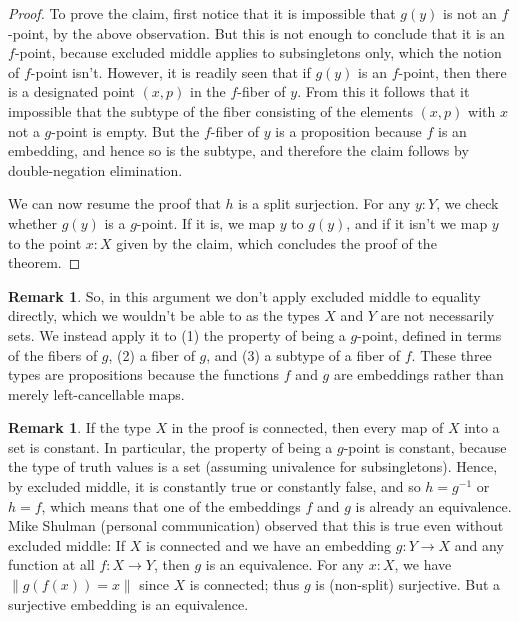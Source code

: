 \documentclass{article}
\theoremstyle{definition}
\newtheorem{remark}[theorem]{Remark}
\begin{document}
\begin{proof}
To prove the claim, first notice that it is impossible that $g(y)$ is not an $f$-point, by the above observation. But this is not enough to conclude that it is an $f$-point, because excluded middle applies to subsingletons only, which the notion of $f$-point isn't. However, it is readily seen that if $g(y)$ is an $f$-point, then there is a designated point $(x,p)$ in the $f$-fiber of $y$. From this it follows that it impossible that the subtype of the fiber consisting of the elements $(x,p)$ with $x$ not a $g$-point is empty. But the $f$-fiber of $y$ is a proposition because $f$ is an embedding, and hence so is the subtype, and therefore the claim follows by double-negation elimination.

We can now resume the proof that $h$ is a split surjection. For any $y:Y$, we check whether $g(y)$ is a $g$-point. If it is, we map $y$ to $g(y)$, and if it isn't we map $y$ to the point $x : X$ given by the claim, which concludes the proof of the theorem.
\end{proof}

\begin{remark}
So, in this argument we don't apply excluded middle to equality
directly, which we wouldn't be able to as the types $X$ and $Y$ are
not necessarily sets. We instead apply it to (1) the property of being
a $g$-point, defined in terms of the fibers of $g$, (2) a fiber of
$g$, and (3) a subtype of a fiber of $f$. These three types are
propositions because the functions $f$ and $g$ are embeddings rather
than merely left-cancellable maps.
\end{remark}

\begin{remark}
  If the type $X$ in the proof is connected, then every map of $X$
  into a set is constant. In particular, the property of being a
  $g$-point is constant, because the type of truth values is a set
  (assuming univalence for subsingletons). Hence, by excluded middle,
  it is constantly true or constantly false, and so $h=g^{-1}$ or
  $h = f$, which means that one of the embeddings $f$ and $g$ is
  already an equivalence.  Mike Shulman (personal communication)
  observed that this is true even without excluded middle: If $X$ is
  connected and we have an embedding $g : Y \to X$ and any function at
  all $f : X \to Y$, then $g$ is an equivalence. For any $x:X$, we
  have $\left\lVert g(f(x)) = x \right\rVert$ since $X$ is connected;
  thus $g$ is (non-split) surjective. But a surjective embedding is an
  equivalence.
\end{remark}




\end{document}
